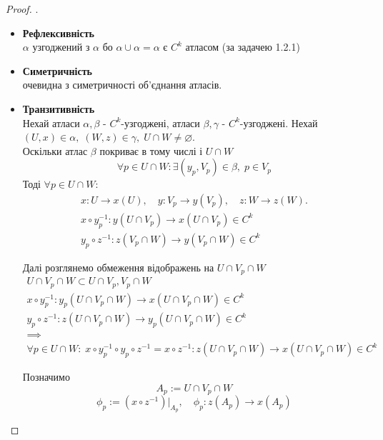 \documentclass[10pt, a4paper]{article} %
\begin{document}
\begin{proof} .\\
    \begin{itemize}
        \item \textbf{Рефлексивність}\\
        $\alpha$ узгоджений з $\alpha$ бо $\alpha\cup\alpha=\alpha$ є $C^k$ атласом (за задачею 1.2.1)

        \item \textbf{Симетричність}\\
        очевидна з симетричності об'єднання атласів.

        \item \textbf{Транзитивність}\\
        Нехай атласи $\alpha,\beta$ - $C^k$-узгоджені, атласи $\beta,\gamma$ - $C^k$-узгоджені.
        Нехай $(U,x)\in\alpha, \; (W,z)\in\gamma, \; U\cap W \ne \varnothing$. \\
        
        Оскільки атлас $\beta$ покриває в тому числі і $U\cap W$
        \[\forall p \in U\cap W: \exists (y_p, V_p) \in \beta, \; p\in V_p\]
        Тоді $\forall p \in U\cap W:$
        \begin{gather*}
            x : U \to x(U), \quad y : V_p \to y(V_p), \quad z : W \to z(W).\\
            x \circ y_p^{-1} : y(U\cap V_p) \to x(U\cap V_p) \in C^k\\
            y_p \circ z^{-1} : z(V_p\cap W) \to y(V_p\cap W) \in C^k
        \end{gather*}

        Далі розглянемо обмеження відображень на $U\cap V_p \cap W$
        \begin{gather*}
            U\cap V_p\cap W \subset U\cap V_p, V_p\cap W\\
            x \circ y_p^{-1} : y_p(U\cap V_p\cap W) \to x(U\cap V_p\cap W) \in C^k\\
            y_p \circ z^{-1} : z(U\cap V_p\cap W) \to y_p(U\cap V_p\cap W) \in C^k\\
            \implies\\
            \forall p\in U\cap W:\; x \circ y_p^{-1} \circ y_p \circ z^{-1} = x \circ z^{-1} : z(U\cap V_p\cap W) \to x(U\cap V_p\cap W) \in C^k
        \end{gather*}

        Позначимо 
        \[A_p := U\cap V_p\cap W\]
        \[\phi_p := \left(x \circ z^{-1}\right)|_{A_p}, \quad \phi_p : z(A_p) \to x(A_p) \]
        

\end{itemize}
\end{proof}
\end{document}
